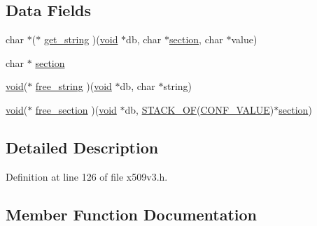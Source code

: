 \subsection*{Data Fields}
\begin{DoxyCompactItemize}
\item 
char $\ast$($\ast$ \hyperlink{struct_x509_v3___c_o_n_f___m_e_t_h_o_d__st_a17f01efaa7525fc939dcf666278539c2}{get\+\_\+string} )(\hyperlink{hw__4758__cca_8h_afad4d591c7931ff6dc5bf69c76c96aa0}{void} $\ast$db, char $\ast$\hyperlink{struct_x509_v3___c_o_n_f___m_e_t_h_o_d__st_a8f787b64195a3ec85f95102bd6824ca0}{section}, char $\ast$value)
\item 
char $\ast$ \hyperlink{struct_x509_v3___c_o_n_f___m_e_t_h_o_d__st_a8f787b64195a3ec85f95102bd6824ca0}{section}
\item 
\hyperlink{hw__4758__cca_8h_afad4d591c7931ff6dc5bf69c76c96aa0}{void}($\ast$ \hyperlink{struct_x509_v3___c_o_n_f___m_e_t_h_o_d__st_a82bd27b8f3c17e474e92e20a8c55a143}{free\+\_\+string} )(\hyperlink{hw__4758__cca_8h_afad4d591c7931ff6dc5bf69c76c96aa0}{void} $\ast$db, char $\ast$string)
\item 
\hyperlink{hw__4758__cca_8h_afad4d591c7931ff6dc5bf69c76c96aa0}{void}($\ast$ \hyperlink{struct_x509_v3___c_o_n_f___m_e_t_h_o_d__st_af854e7c24f99513ec27f166745a207b3}{free\+\_\+section} )(\hyperlink{hw__4758__cca_8h_afad4d591c7931ff6dc5bf69c76c96aa0}{void} $\ast$db, \hyperlink{struct_x509_v3___c_o_n_f___m_e_t_h_o_d__st_a1e9106830d55c22aed10737bb2de5f6a}{S\+T\+A\+C\+K\+\_\+\+OF}(\hyperlink{struct_c_o_n_f___v_a_l_u_e}{C\+O\+N\+F\+\_\+\+V\+A\+L\+UE})$\ast$\hyperlink{struct_x509_v3___c_o_n_f___m_e_t_h_o_d__st_a8f787b64195a3ec85f95102bd6824ca0}{section})
\end{DoxyCompactItemize}


\subsection{Detailed Description}


Definition at line 126 of file x509v3.\+h.



\subsection{Member Function Documentation}
